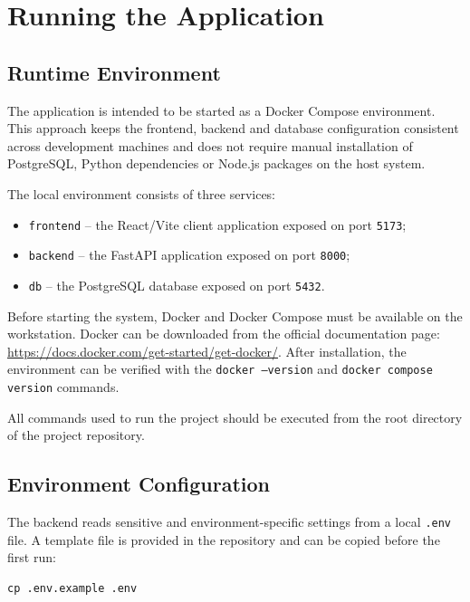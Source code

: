 \section{Running the Application}

\subsection{Runtime Environment}

The application is intended to be started as a Docker Compose environment. This approach keeps the frontend, backend and database configuration consistent across development machines and does not require manual installation of PostgreSQL, Python dependencies or Node.js packages on the host system.

The local environment consists of three services:

\begin{itemize}
    \item \texttt{frontend} -- the React/Vite client application exposed on port \texttt{5173};
    \item \texttt{backend} -- the FastAPI application exposed on port \texttt{8000};
    \item \texttt{db} -- the PostgreSQL database exposed on port \texttt{5432}.
\end{itemize}

Before starting the system, Docker and Docker Compose must be available on the workstation. Docker can be downloaded from the official documentation page: \url{https://docs.docker.com/get-started/get-docker/}. After installation, the environment can be verified with the \texttt{docker --version} and \texttt{docker compose version} commands.

All commands used to run the project should be executed from the root directory of the project repository.

\subsection{Environment Configuration}

The backend reads sensitive and environment-specific settings from a local \texttt{.env} file. A template file is provided in the repository and can be copied before the first run:

\begin{verbatim}
cp .env.example .env
\end{verbatim}

